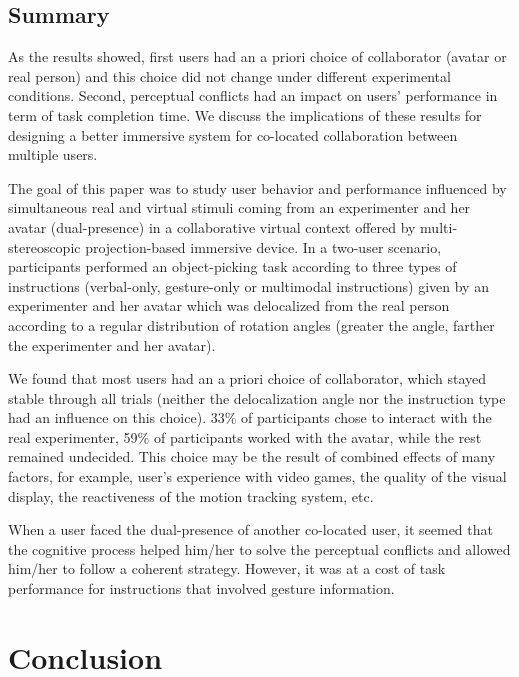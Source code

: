 \subsection{Summary}
As the results showed, first users had an a priori choice of collaborator (avatar or real person) and this choice did not change under different experimental conditions. Second, perceptual conflicts had an impact on users' performance in term of task completion time. We discuss the implications of these results for designing a better immersive system for co-located collaboration between multiple users.

The goal of this paper was to study user behavior and performance influenced by simultaneous real and virtual stimuli coming from an experimenter and her avatar (dual-presence) in a collaborative virtual context offered by multi-stereoscopic projection-based immersive device. In a two-user scenario, participants performed an object-picking task according to three types of instructions (verbal-only, gesture-only or multimodal instructions) given by an experimenter and her avatar which was delocalized from the real person according to a regular distribution of rotation angles (greater the angle, farther the experimenter and her avatar).

We found that most users had an a priori choice of collaborator, which stayed stable through all trials (neither the delocalization angle nor the instruction type had an influence on this choice). 33\% of participants chose to interact with the real experimenter, 59\% of participants worked with the avatar, while the rest remained undecided. This choice may be the result of combined effects of many factors, for example, user's experience with video games, the quality of the visual display, the reactiveness of the motion tracking system, etc.

When a user faced the dual-presence of another co-located user, it seemed that the cognitive process helped him/her to solve the perceptual conflicts and allowed him/her to follow a coherent strategy. However, it was at a cost of task performance for instructions that involved gesture information.

\section{Conclusion}

